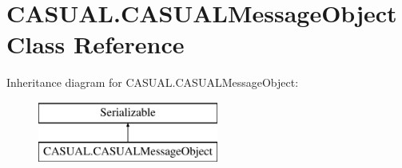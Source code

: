 \hypertarget{class_c_a_s_u_a_l_1_1_c_a_s_u_a_l_message_object}{\section{C\-A\-S\-U\-A\-L.\-C\-A\-S\-U\-A\-L\-Message\-Object Class Reference}
\label{class_c_a_s_u_a_l_1_1_c_a_s_u_a_l_message_object}
}
Inheritance diagram for C\-A\-S\-U\-A\-L.\-C\-A\-S\-U\-A\-L\-Message\-Object\-:\begin{figure}[H]
\begin{center}
\leavevmode
\includegraphics[height=2.000000cm]{class_c_a_s_u_a_l_1_1_c_a_s_u_a_l_message_object}
\end{center}
\end{figure}
